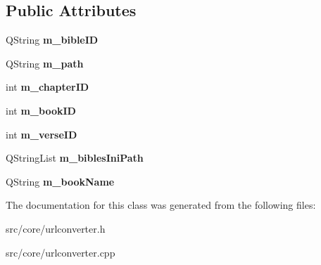 \subsection*{Public Attributes}
\begin{DoxyCompactItemize}
\item 
\hypertarget{classUrlConverter_a95859ac74e65e888325a0e4625b6407e}{
QString {\bfseries m\_\-bibleID}}
\label{classUrlConverter_a95859ac74e65e888325a0e4625b6407e}

\item 
\hypertarget{classUrlConverter_ab2f1bb8ad720e700e1bb4d86cdfb7e93}{
QString {\bfseries m\_\-path}}
\label{classUrlConverter_ab2f1bb8ad720e700e1bb4d86cdfb7e93}

\item 
\hypertarget{classUrlConverter_ace3f701e2b94b6219494e855a1a3c79b}{
int {\bfseries m\_\-chapterID}}
\label{classUrlConverter_ace3f701e2b94b6219494e855a1a3c79b}

\item 
\hypertarget{classUrlConverter_aa2a7fe9e8561377f85690b8cfe502af9}{
int {\bfseries m\_\-bookID}}
\label{classUrlConverter_aa2a7fe9e8561377f85690b8cfe502af9}

\item 
\hypertarget{classUrlConverter_aa982ba24328bb5973f5f68eb70e71406}{
int {\bfseries m\_\-verseID}}
\label{classUrlConverter_aa982ba24328bb5973f5f68eb70e71406}

\item 
\hypertarget{classUrlConverter_a38475d954fe205a3fbbb765f5d9ac2b1}{
QStringList {\bfseries m\_\-biblesIniPath}}
\label{classUrlConverter_a38475d954fe205a3fbbb765f5d9ac2b1}

\item 
\hypertarget{classUrlConverter_aa5f489b0c40f7fe3cf7481f97773bb6c}{
QString {\bfseries m\_\-bookName}}
\label{classUrlConverter_aa5f489b0c40f7fe3cf7481f97773bb6c}

\end{DoxyCompactItemize}


The documentation for this class was generated from the following files:\begin{DoxyCompactItemize}
\item 
src/core/urlconverter.h\item 
src/core/urlconverter.cpp\end{DoxyCompactItemize}
